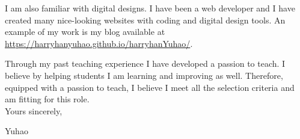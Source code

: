 \documentclass{article}
\theoremstyle{definition}
\theoremstyle{definition}
\theoremstyle{remark}
\begin{document}
I am also familiar with digital designs. I have been a web developer and I have created many nice-looking websites with coding and digital design tools. An example of my work is my blog available at 
\\ \href{https://harryhanyuhao.github.io/harryhanYuhao/}{https://harryhanyuhao.github.io/harryhanYuhao/}. 

Through my past teaching experience I have developed a passion to teach. I believe by helping students I am learning and improving as well. Therefore, equipped with a passion to teach, I believe I meet all the selection criteria and am fitting for this role.
\\

Yours sincerely, 

Yuhao
\end{document}
